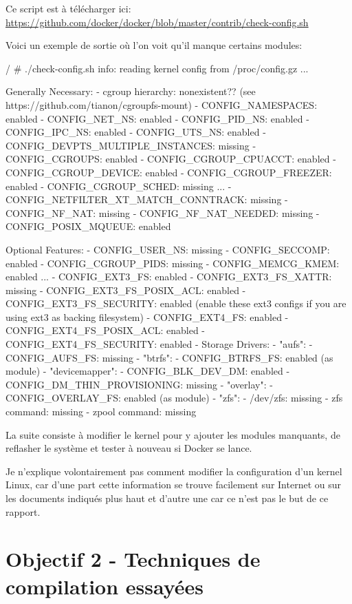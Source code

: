 \documentclass[11pt,a4paper,oneside]{report}
\begin{document}
Ce script est à télécharger ici: \url{https://github.com/docker/docker/blob/master/contrib/check-config.sh}

\newpage
Voici un exemple de sortie où l'on voit qu'il manque certains modules:

\begin{bashcode}
/ # ./check-config.sh
info: reading kernel config from /proc/config.gz ...

Generally Necessary:
- cgroup hierarchy: nonexistent??
    (see https://github.com/tianon/cgroupfs-mount)
- CONFIG_NAMESPACES: enabled
- CONFIG_NET_NS: enabled
- CONFIG_PID_NS: enabled
- CONFIG_IPC_NS: enabled
- CONFIG_UTS_NS: enabled
- CONFIG_DEVPTS_MULTIPLE_INSTANCES: missing
- CONFIG_CGROUPS: enabled
- CONFIG_CGROUP_CPUACCT: enabled
- CONFIG_CGROUP_DEVICE: enabled
- CONFIG_CGROUP_FREEZER: enabled
- CONFIG_CGROUP_SCHED: missing
...
- CONFIG_NETFILTER_XT_MATCH_CONNTRACK: missing
- CONFIG_NF_NAT: missing
- CONFIG_NF_NAT_NEEDED: missing
- CONFIG_POSIX_MQUEUE: enabled

Optional Features:
- CONFIG_USER_NS: missing
- CONFIG_SECCOMP: enabled
- CONFIG_CGROUP_PIDS: missing
- CONFIG_MEMCG_KMEM: enabled
...
- CONFIG_EXT3_FS: enabled
- CONFIG_EXT3_FS_XATTR: missing
- CONFIG_EXT3_FS_POSIX_ACL: enabled
- CONFIG_EXT3_FS_SECURITY: enabled
    (enable these ext3 configs if you are using ext3 as backing filesystem)
- CONFIG_EXT4_FS: enabled
- CONFIG_EXT4_FS_POSIX_ACL: enabled
- CONFIG_EXT4_FS_SECURITY: enabled
- Storage Drivers:
  - "aufs":
    - CONFIG_AUFS_FS: missing
  - "btrfs":
    - CONFIG_BTRFS_FS: enabled (as module)
  - "devicemapper":
    - CONFIG_BLK_DEV_DM: enabled
    - CONFIG_DM_THIN_PROVISIONING: missing
  - "overlay":
    - CONFIG_OVERLAY_FS: enabled (as module)
  - "zfs":
    - /dev/zfs: missing
    - zfs command: missing
    - zpool command: missing
\end{bashcode}

La suite consiste à modifier le kernel pour y ajouter les modules manquants, de reflasher le système et tester à nouveau si Docker se lance.

Je n'explique volontairement pas comment modifier la configuration d'un kernel Linux, car d'une part cette information se trouve facilement sur Internet ou sur les documents indiqués plus haut et d'autre une car ce n'est pas le but de ce rapport.

\chapter{Objectif 2 - Techniques de compilation essayées}
\end{document}

